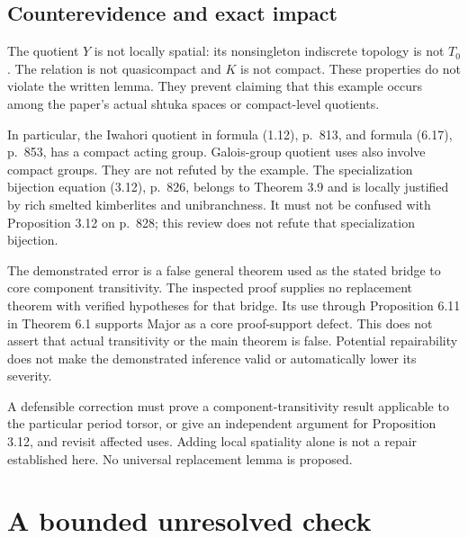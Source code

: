 \documentclass[10pt]{article}
\begin{document}
\subsection*{Counterevidence and exact impact}
The quotient \(Y\) is not locally spatial: its nonsingleton indiscrete topology is not \(T_0\). The relation is not quasicompact and \(K\) is not compact. These properties do not violate the written lemma. They prevent claiming that this example occurs among the paper’s actual shtuka spaces or compact-level quotients.\par
In particular, the Iwahori quotient in formula (1.12), p. 813, and formula (6.17), p. 853, has a compact acting group. Galois-group quotient uses also involve compact groups. They are not refuted by the example. The specialization bijection equation (3.12), p. 826, belongs to Theorem 3.9 and is locally justified by rich smelted kimberlites and unibranchness. It must not be confused with Proposition 3.12 on p. 828; this review does not refute that specialization bijection.\par
The demonstrated error is a false general theorem used as the stated bridge to core component transitivity. The inspected proof supplies no replacement theorem with verified hypotheses for that bridge. Its use through Proposition 6.11 in Theorem 6.1 supports Major as a core proof-support defect. This does not assert that actual transitivity or the main theorem is false. Potential repairability does not make the demonstrated inference valid or automatically lower its severity.\par
A defensible correction must prove a component-transitivity result applicable to the particular period torsor, or give an independent argument for Proposition 3.12, and revisit affected uses. Adding local spatiality alone is not a repair established here. No universal replacement lemma is proposed.\par
\section*{A bounded unresolved check}
\end{document}
